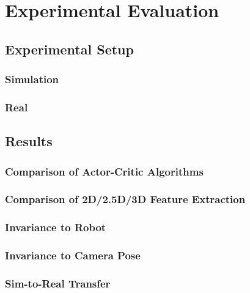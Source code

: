 \chapter{Experimental Evaluation}\label{ch:experimental_evaluation}



\section{Experimental Setup}


\subsection{Simulation}


\subsection{Real}





\section{Results}

\subsection{Comparison of Actor-Critic Algorithms}

\subsection{Comparison of 2D/2.5D/3D Feature Extraction}

\subsection{Invariance to Robot}

\subsection{Invariance to Camera Pose}

\subsection{Sim-to-Real Transfer}



